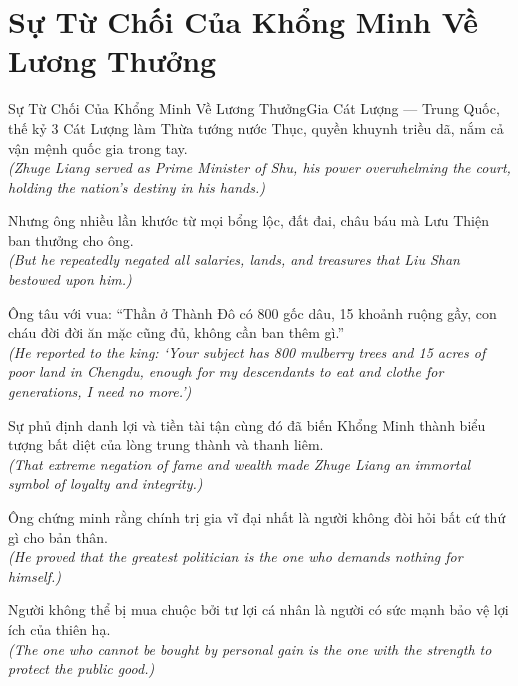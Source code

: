 \section{Sự Từ Chối Của Khổng Minh Về Lương Thưởng}
\begin{truyen}{Sự Từ Chối Của Khổng Minh Về Lương Thưởng}{Gia Cát Lượng --- Trung Quốc, thế kỷ 3}
 Cát Lượng làm Thừa tướng nước Thục, quyền khuynh triều dã, nắm cả vận mệnh quốc gia trong tay.\\[4pt]
\textit{(Zhuge Liang served as Prime Minister of Shu, his power overwhelming the court, holding the nation's destiny in his hands.)}

Nhưng ông nhiều lần khước từ mọi bổng lộc, đất đai, châu báu mà Lưu Thiện ban thưởng cho ông.\\[4pt]
\textit{(But he repeatedly negated all salaries, lands, and treasures that Liu Shan bestowed upon him.)}

Ông tâu với vua: ``Thần ở Thành Đô có 800 gốc dâu, 15 khoảnh ruộng gầy, con cháu đời đời ăn mặc cũng đủ, không cần ban thêm gì.''\\[4pt]
\textit{(He reported to the king: `Your subject has 800 mulberry trees and 15 acres of poor land in Chengdu, enough for my descendants to eat and clothe for generations, I need no more.')}

Sự phủ định danh lợi và tiền tài tận cùng đó đã biến Khổng Minh thành biểu tượng bất diệt của lòng trung thành và thanh liêm.\\[4pt]
\textit{(That extreme negation of fame and wealth made Zhuge Liang an immortal symbol of loyalty and integrity.)}

Ông chứng minh rằng chính trị gia vĩ đại nhất là người không đòi hỏi bất cứ thứ gì cho bản thân.\\[4pt]
\textit{(He proved that the greatest politician is the one who demands nothing for himself.)}

\end{truyen}
\begin{baihoc}
  Người không thể bị mua chuộc bởi tư lợi cá nhân là người có sức mạnh bảo vệ lợi ích của thiên hạ.\\[4pt]
  \textit{(The one who cannot be bought by personal gain is the one with the strength to protect the public good.)}
\end{baihoc}

